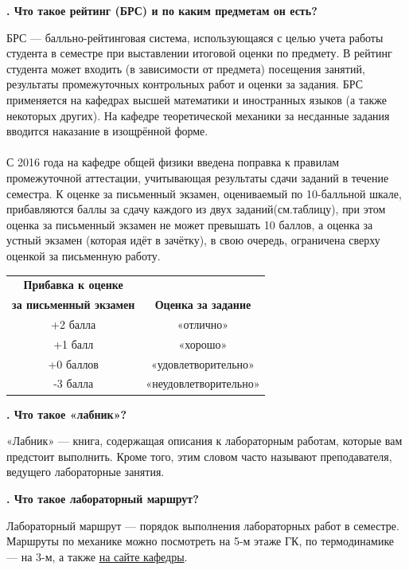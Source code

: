 \documentclass[14pt]{extarticle}
\newcounter{question}
\newcommand\Que[1]{%
    \begin{minipage}{\textwidth}
    \leavevmode\par
    \stepcounter{question}
    \noindent
    {\large\textbf{\thequestion. #1}}\par}
\newcommand\Ans[2][]{%
    \leavevmode\par\noindent
    {\leftskip37pt
    \textbf{#1}#2\par}
    \end{minipage}}
\newcommand\Partans[2][]{%
    \leavevmode\par\noindent
    {\leftskip37pt
    \textbf{#1}#2\par}}
\begin{document}
\Que{Что такое рейтинг (БРС) и по каким предметам он есть?}
\Partans{БРС — балльно-рейтинговая система, использующаяся с целью учета работы студента в семестре при выставлении итоговой оценки по предмету. В рейтинг студента может входить (в зависимости от предмета) посещения занятий, результаты промежуточных контрольных работ и оценки за задания. БРС применяется на кафедрах высшей математики и иностранных языков (а также некоторых других). На кафедре теоретической механики за несданные задания вводится наказание в изощрённой форме. \\ \\ С 2016 года на кафедре общей физики введена поправка к правилам промежуточной аттестации, учитывающая результаты сдачи заданий в течение семестра. К оценке за письменный экзамен, оцениваемый по 10-балльной шкале, прибавляются баллы за сдачу каждого из двух заданий(см.таблицу), при этом оценка за письменный экзамен не может превышать 10 баллов, а оценка за устный экзамен (которая идёт в зачётку), в свою очередь, ограничена сверху оценкой за письменную работу.}

\begin{center}
\begin{tabular}{ |c|c| }
\hline
    \textbf{Прибавка к оценке} & \\
    \textbf{за письменный экзамен} & \textbf{Оценка за задание} \\ \hline
    +2 балла & «отлично» \\ \hline
    +1 балл & «хорошо» \\ \hline
    +0 баллов & «удовлетворительно» \\ \hline
    -3 балла & «неудовлетворительно» \\
\hline
\end{tabular}
\end{center}
\end{minipage}

\Que{Что такое «лабник»?}
\Ans{«Лабник» — книга, содержащая описания к лабораторным работам, которые вам предстоит выполнить. Кроме того, этим словом часто называют преподавателя, ведущего лабораторные занятия.}

\Que{Что такое лабораторный маршрут?}
\Ans{Лабораторный маршрут — порядок выполнения лабораторных работ в семестре. Маршруты по механике можно посмотреть на 5-м этаже ГК, по термодинамике — на 3-м, а также \href{https://mipt.ru/education/chair/physics/S_I/lab/}{на сайте кафедры}.}
\end{document}
